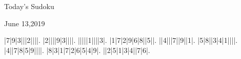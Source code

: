 \documentclass{article}
\begin{document}
\begin{center}
\Huge{Today's Sudoku}
\end{center}
\begin{center}
\Large{June 13,2019}
\end{center}
\begin{sudoku}
|7|9|3|||2||||.
|2||||9|3||||.
|||||1||||3|.
|1|7|2|9|6|8||5||.
||4|||7||9||1|.
|5|8||3|4|1||||.
|4||7|8|5|9||||.
|8|3|1|7|2|6|5|4|9|.
||2|5|1|3|4||7|6|.
\end{sudoku}
\end{document}
